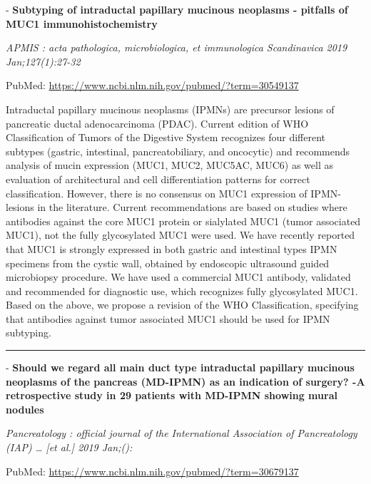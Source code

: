 \documentclass[]{article}
\begin{document}
 - \textbf{Subtyping of intraductal papillary mucinous neoplasms -
pitfalls of MUC1 immunohistochemistry}

\emph{APMIS : acta pathologica, microbiologica, et immunologica
Scandinavica 2019 Jan;127(1):27-32}

PubMed: \url{https://www.ncbi.nlm.nih.gov/pubmed/?term=30549137}

Intraductal papillary mucinous neoplasms (IPMNs) are precursor lesions
of pancreatic ductal adenocarcinoma (PDAC). Current edition of WHO
Classification of Tumors of the Digestive System recognizes four
different subtypes (gastric, intestinal, pancreatobiliary, and
oncocytic) and recommends analysis of mucin expression (MUC1, MUC2,
MUC5AC, MUC6) as well as evaluation of architectural and cell
differentiation patterns for correct classification. However, there is
no consensus on MUC1 expression of IPMN-lesions in the literature.
Current recommendations are based on studies where antibodies against
the core MUC1 protein or sialylated MUC1 (tumor associated MUC1), not
the fully glycosylated MUC1 were used. We have recently reported that
MUC1 is strongly expressed in both gastric and intestinal types IPMN
specimens from the cystic wall, obtained by endoscopic ultrasound guided
microbiopsy procedure. We have used a commercial MUC1 antibody,
validated and recommended for diagnostic use, which recognizes fully
glycosylated MUC1. Based on the above, we propose a revision of the WHO
Classification, specifying that antibodies against tumor associated MUC1
should be used for IPMN subtyping.

{}

{}

\begin{center}\rule{0.5\linewidth}{\linethickness}\end{center}

 - \textbf{Should we regard all main duct type intraductal papillary
mucinous neoplasms of the pancreas (MD-IPMN) as an indication of
surgery? -A retrospective study in 29 patients with MD-IPMN showing
mural nodules}

\emph{Pancreatology : official journal of the International Association
of Pancreatology (IAP) \ldots{} {[}et al.{]} 2019 Jan;():}

PubMed: \url{https://www.ncbi.nlm.nih.gov/pubmed/?term=30679137}
\end{document}
